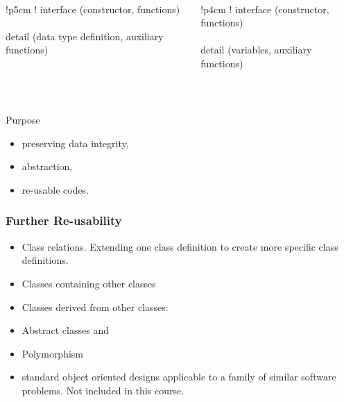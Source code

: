 \begin{frame}
\begin{columns}
 \begin{column}{.5\linewidth}
  \noindent{}\\
\begin{tabular}{
!{\color{red!70!black}\vrule width 1pt}p{5cm}
!{\color{red!70!black}\vrule width 1pt}} 
 interface {\tiny (constructor, functions)} \\ \hline \\
 detail {\tiny (\alert{data type definition}, auxiliary functions)}   
\end{tabular}
 \end{column}
\begin{column}{.5\linewidth}
  \noindent{}\\
\begin{tabular}{
!{\color{red!70!black}\vrule width 1pt}p{4cm}
!{\color{red!70!black}\vrule width 1pt}} 
 interface {\tiny (constructor, functions)}\\ \hline \\
 detail {\tiny (\alert{variables}, auxiliary functions)}   
\end{tabular}
\end{column}
\end{columns}
\ \\[2em]
\begin{block}{Purpose}
\begin{itemize}
 \item preserving data integrity, 
 \item abstraction, 
 \item re-usable codes.
\end{itemize}
\end{block}
\end{frame}

\begin{frame}
\frametitle{Further Re-usability}
\begin{itemize}
\item Class relations. Extending one class definition to create 
more specific class definitions.
\item Classes containing other classes
\item Classes derived from other classes: 
\item Abstract classes and 
\item Polymorphism
\item {} standard object oriented designs applicable to a
	family of similar software problems. Not included in this course.
\end{itemize}
\end{frame}



